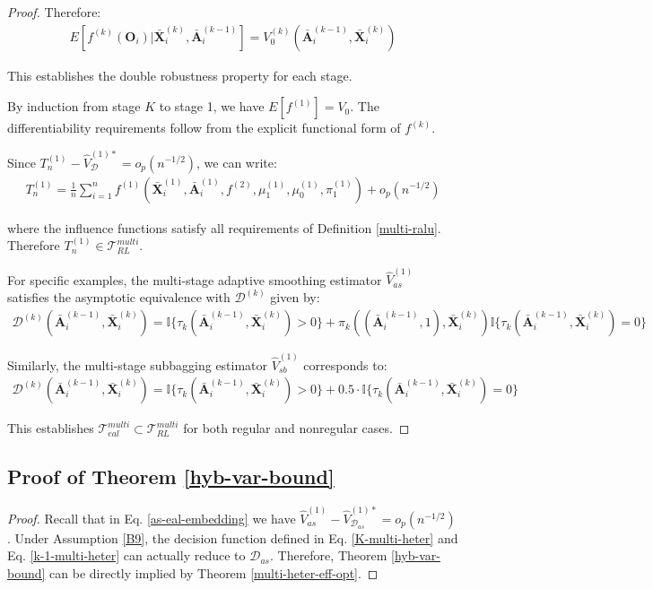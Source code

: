 \documentclass[11pt]{article}
\theoremstyle{referenceplain}
\theoremstyle{referencedefinition}
\theoremstyle{referenceremark}
\begin{document}
\begin{proof}
Therefore:
\begin{align*}
    E[f^{(k)}(\mathbf{O}_i)|\bar{\mathbf{X}}_i^{(k)}, \bar{\mathbf{A}}_i^{(k-1)}] = V_0^{(k)}(\bar{\mathbf{A}}_i^{(k-1)}, \bar{\mathbf{X}}_i^{(k)})
\end{align*}

This establishes the double robustness property for each stage.

By induction from stage $K$ to stage 1, we have $E[f^{(1)}] = V_0$. The differentiability requirements follow from the explicit functional form of $f^{(k)}$.

Since $T_n^{(1)} - \widehat{V}_{\mathcal{D}}^{(1)*} = o_p(n^{-1/2})$, we can write:
\begin{align*}
    T_n^{(1)} = \frac{1}{n}\sum_{i=1}^n f^{(1)}(\bar{\mathbf{X}}_i^{(1)}, \bar{\mathbf{A}}_i^{(1)}, f^{(2)}, \mu_1^{(1)}, \mu_0^{(1)}, \pi_1^{(1)}) + o_p(n^{-1/2})
\end{align*}

where the influence functions satisfy all requirements of Definition \ref{multi-ralu}. Therefore $T_n^{(1)} \in \mathcal{T}_{RL}^{multi}$.

For specific examples, the multi-stage adaptive smoothing estimator $\widehat{V}_{as}^{(1)}$ satisfies the asymptotic equivalence with $\mathcal{D}^{(k)}$ given by:
\begin{align*}
    \mathcal{D}^{(k)}(\bar{\mathbf{A}}_i^{(k-1)}, \bar{\mathbf{X}}_i^{(k)}) = \mathbb{I}\{\tau_k(\bar{\mathbf{A}}_i^{(k-1)}, \bar{\mathbf{X}}_i^{(k)}) > 0\} + \pi_k((\bar{\mathbf{A}}_i^{(k-1)}, 1), \bar{\mathbf{X}}_i^{(k)}) \mathbb{I}\{\tau_k(\bar{\mathbf{A}}_i^{(k-1)}, \bar{\mathbf{X}}_i^{(k)}) = 0\}
\end{align*}

Similarly, the multi-stage subbagging estimator $\widehat{V}_{sb}^{(1)}$ corresponds to:
\begin{align*}
    \mathcal{D}^{(k)}(\bar{\mathbf{A}}_i^{(k-1)}, \bar{\mathbf{X}}_i^{(k)}) = \mathbb{I}\{\tau_k(\bar{\mathbf{A}}_i^{(k-1)}, \bar{\mathbf{X}}_i^{(k)}) > 0\} + 0.5 \cdot \mathbb{I}\{\tau_k(\bar{\mathbf{A}}_i^{(k-1)}, \bar{\mathbf{X}}_i^{(k)}) = 0\}
\end{align*}

This establishes $\mathcal{T}_{eal}^{multi} \subset \mathcal{T}_{RL}^{multi}$ for both regular and nonregular cases.
\end{proof}
\subsection{Proof of Theorem \ref{hyb-var-bound}}
\begin{proof}
   Recall that in Eq. \eqref{as-eal-embedding} we have $\widehat{V}_{as}^{(1)} - \widehat{V}_{\mathcal{D}_{as}}^{(1)*} = o_p(n^{-1/2})$. Under Assumption \ref{B9}, the decision function defined in Eq. \eqref{K-multi-heter} and  Eq. \eqref{k-1-multi-heter} can actually reduce to $\mathcal{D}_{as}$. Therefore, Theorem \ref{hyb-var-bound} can be directly implied by Theorem \ref{multi-heter-eff-opt}.
\end{proof}
\end{document}
